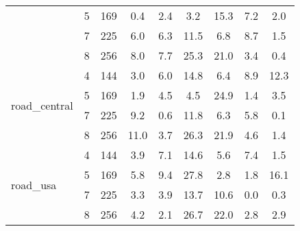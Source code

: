 \begin{tabular}[c]{| l | c | c | c | c | c | c | c | c |}
 & 5 & 169 & \cellcolor{blue!25} 0.4 & \cellcolor{red!25} 2.4 & 3.2 & 15.3 & 7.2 & 2.0 \\ \cline{2-9}
 & 7 & 225 & 6.0 & \cellcolor{green!25} 6.3 & 11.5 & 6.8 & 8.7 & 1.5 \\ \cline{2-9}
 & 8 & 256 & 8.0 & \cellcolor{green!25} 7.7 & 25.3 & 21.0 & 3.4 & 0.4 \\ \hline
\multirow{4}{*}{road\_central} & 4 & 144 & 3.0 & \cellcolor{green!25} 6.0 & 14.8 & 6.4 & 8.9 & 12.3 \\ \cline{2-9}
 & 5 & 169 & 1.9 & \cellcolor{green!25} 4.5 & 4.5 & 24.9 & 1.4 & 3.5 \\ \cline{2-9}
 & 7 & 225 & 9.2 & \cellcolor{green!25} 0.6 & 11.8 & 6.3 & 5.8 & 0.1 \\ \cline{2-9}
 & 8 & 256 & 11.0 & \cellcolor{green!25} 3.7 & 26.3 & 21.9 & 4.6 & 1.4 \\ \hline
\multirow{4}{*}{road\_usa} & 4 & 144 & 3.9 & \cellcolor{green!25} 7.1 & 14.6 & 5.6 & 7.4 & 1.5 \\ \cline{2-9}
 & 5 & 169 & 5.8 & \cellcolor{green!25} 9.4 & 27.8 & 2.8 & 1.8 & 16.1 \\ \cline{2-9}
 & 7 & 225 & 3.3 & \cellcolor{green!25} 3.9 & 13.7 & 10.6 & 0.0 & 0.3 \\ \cline{2-9}
 & 8 & 256 & 4.2 & \cellcolor{green!25} 2.1 & 26.7 & 22.0 & 2.8 & 2.9 \\ \hline
\end{tabular} 
